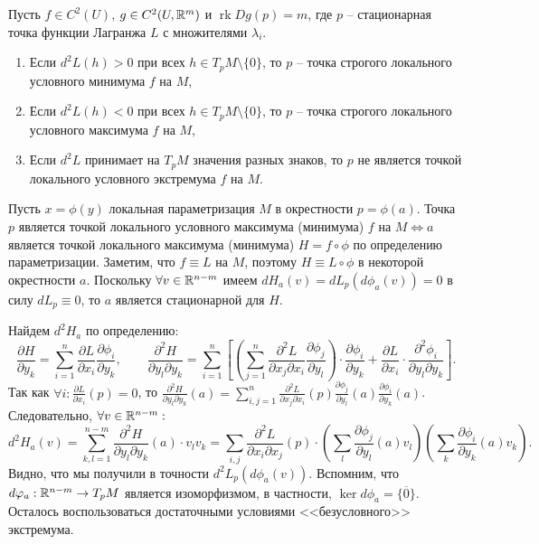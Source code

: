 \begin{theorem}
	Пусть $f \in C^2(U)$, $g \in C^2(U, \mathbb{R}^m)$ и $\operatorname{rk} Dg(p) = m$, где $p$ -- стационарная точка функции Лагранжа $L$ с множителями $\lambda_i$.
	\begin{enumerate}[itemsep = 0pt, topsep = 5pt]
		\item Если $d^2 L(h) > 0$ при всех $h \in T_p M \setminus \{0\}$, то $p$ -- точка строгого локального условного минимума $f$ на $M$,
		\item Если $d^2 L(h) < 0$ при всех $h \in T_p M \setminus \{0\}$, то $p$ -- точка строгого локального условного максимума $f$ на $M$,
		\item Если $d^2 L$ принимает на $T_p M$ значения разных знаков, то $p$ не является точкой локального условного экстремума $f$ на $M$.
	\end{enumerate}
\end{theorem}

\begin{myproof}
	Пусть $x = \phi(y)$ локальная параметризация $M$ в окрестности $p = \phi(a)$. 
	Точка $p$ является точкой локального условного максимума (минимума) $f$ на $M \Leftrightarrow a$ является точкой локального максимума (минимума) $H = f \circ \phi$ по определению параметризации.
	Заметим, что $f \equiv L$ на $M$, поэтому $H \equiv L \circ \phi$ в некоторой окрестности $a$.
	Поскольку $\forall v \in \mathbb{R}^{n-m}$ имеем $dH_a(v) = d L_p ( d \phi_a (v) ) = 0$ в силу $dL_p \equiv 0$, то $a$ является стационарной для $H$.

	\vspace{5pt}
	Найдем $d^2 H_a$ по определению:
	\[ \frac{\partial H}{\partial y_k} = \sum \limits_{i=1}^{n} \frac{\partial L}{\partial x_i} \frac{\partial \phi_i}{\partial y_k}, \qquad \frac{\partial^2 H}{\partial y_l \partial y_k} = \sum \limits_{i=1}^{n} \left[ \left( \sum \limits_{j=1}^{n} \frac{\partial^2 L}{\partial x_j \partial x_i} \frac{\partial \phi_j}{\partial y_l} \right) \cdot \frac{\partial \phi_i}{\partial y_k} + \frac{\partial L}{\partial x_i} \cdot \frac{\partial^2 \phi_i}{\partial y_l \partial y_k} \right]. \]
	Так как $\forall i : \frac{\partial L}{\partial x_i} (p) = 0$, то $\frac{\partial^2 H}{\partial y_l \partial y_k} (a) = \sum \limits_{i, j=1}^{n} \frac{\partial^2 L}{\partial x_j \partial x_i} (p) \frac{\partial \phi_j}{\partial y_l}(a) \frac{\partial \phi_i}{\partial y_k}(a)$.
	Следовательно, $\forall v \in \mathbb{R}^{n-m}:$
	\[ d^2 H_a (v) =  \sum \limits_{k, l = 1}^{n-m} \frac{\partial^2 H}{\partial y_l \partial y_k}(a) \cdot v_l v_k = \sum \limits_{i, j} \frac{\partial^2 L}{\partial x_i \partial x_j}(p) \cdot \left( \sum \limits_{l} \frac{\partial \phi_j}{\partial y_l}(a) v_l \right) \left( \sum \limits_{k} \frac{\partial \phi_i}{\partial y_k}(a) v_k \right). \]
	Видно, что мы получили в точности $d^2 L_p (d \phi_a (v))$. 
	Вспомним, что $d \varphi_a : \mathbb{R}^{n-m} \to T_p M$ является изоморфизмом, в частности, $\ker d \phi_a = \{\overline{0}\}$.
	Осталось воспользоваться достаточными условиями <<безусловного>> экстремума.
\end{myproof}

